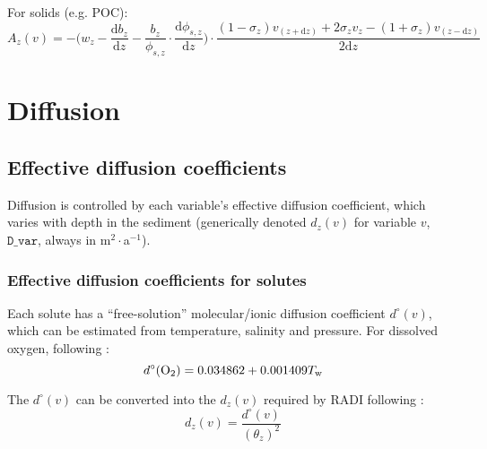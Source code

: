 \documentclass[a4paper]{article}
\newcommand{\D}[1]{\mathrm{d}#1}
\newcommand{\code}[1]{\texttt{#1}}
\newcommand{\dydx}[2]{\frac{\D{#1}}{\D{#2}}}
\begin{document}
For solids (e.g. POC):
\begin{equation}
A_z(v) = -\Bigg( w_z - \dydx{b_z}{z} - \frac{b_z}{\phi_{s,z}} \cdot \dydx{\phi_{s,z}}{z} \Bigg) \cdot \frac{(1 - \sigma_z) v_{(z+\D{z})} + 2 \sigma_z v_z - (1 + \sigma_z) v_{(z-\D{z})}}{2\D{z}}
\end{equation}


\section{Diffusion}\label{sx:diffusion}

\subsection{Effective diffusion coefficients}

Diffusion is controlled by each variable's effective diffusion coefficient, which varies with depth in the sediment (generically denoted $d_z(v)$ for variable $v$, $\code{D\_var}$, always in m$^2\cdot$a$^{-1}$).


\subsubsection{Effective diffusion coefficients for solutes}

Each solute has a ``free-solution'' molecular/ionic diffusion coefficient $d^\circ(v)$, which can be estimated from temperature, salinity and pressure. For dissolved oxygen, following \citet{li_diffusion_1974}:
\begin{equation}
d^\circ(\ce{O2}) = 0.034862 + 0.001409 T_\mathrm{w}
\end{equation}

The $d^\circ(v)$ can be converted into the $d_z(v)$ required by RADI following \citet{boudreau_method_1996}:
\begin{equation}
d_z(v) = \frac{d^\circ(v)}{(\theta_z)^2}
\end{equation}
\end{document}
